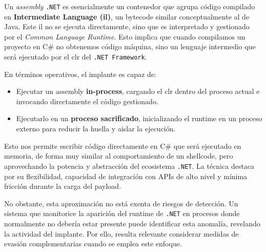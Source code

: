 Un \textit{assembly} \texttt{.NET} es esencialmente un contenedor que agrupa código compilado en \textbf{Intermediate Language (\acrshort{il})}, un bytecode similar conceptualmente al de Java. Este \acrshort{il} no se ejecuta directamente, sino que es interpretado y gestionado por el \textit{Common Language Runtime}. Esto implica que cuando compilamos un proyecto en C\# no obtenemos código máquina, sino un lenguaje intermedio que será ejecutado por el \acrshort{clr} del \texttt{.NET Framework}.

En términos operativos, el implante es capaz de:

\begin{itemize}
\item Ejecutar un assembly \textbf{in-process}, cargando el \acrshort{clr} dentro del proceso actual e invocando directamente el código gestionado.
\item Ejecutarlo en un \textbf{proceso sacrificado}, inicializando el runtime en un proceso externo para reducir la huella y aislar la ejecución.
\end{itemize}

Esto nos permite escribir código directamente en C\# que será ejecutado en memoria, de forma muy similar al comportamiento de un shellcode, pero aprovechando la potencia y abstracción del ecosistema \texttt{.NET}. La técnica destaca por su flexibilidad, capacidad de integración con APIs de alto nivel y mínima fricción durante la carga del payload.

No obstante, esta aproximación no está exenta de riesgos de detección. Un sistema que monitorice la aparición del runtime de \texttt{.NET} en procesos donde normalmente no debería estar presente puede identificar esta anomalía, revelando la actividad del implante. Por ello, resulta relevante considerar medidas de evasión complementarias cuando se emplea este enfoque.